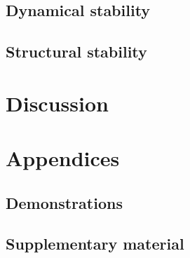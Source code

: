 \documentclass[12pt, titlepage, twoside, openright]{report}
\begin{document}
  \section{Dynamical stability}
  
  \FloatBarrier
  \newpage
  \section{Structural stability}\label{sec : results structural stability}
  
  \FloatBarrier

%  
  \chapter{Discussion}
  
  \FloatBarrier
  \chapter{Appendices}
  \section{Demonstrations}
  
  \FloatBarrier
  \section{Supplementary material}
  
  \FloatBarrier

  \printbibliography
\end{document}
